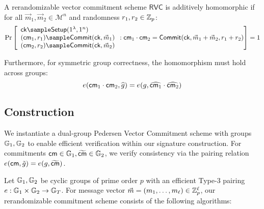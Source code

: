 \begin{definition}
A rerandomizable vector commitment scheme $\mathsf{RVC}$ is additively homomorphic if for all $\vec{m}_1, \vec{m}_2 \in \mathcal{M}^n$ and randomness $r_1, r_2 \in \mathbb{Z}_p$:
\[
    \Pr\left[
    \begin{array}{l}
        \mathsf{ck} \sample \mathsf{Setup}(1^\lambda, 1^n) \\
        (\cm_1, r_1) \sample \mathsf{Commit}(\mathsf{ck}, \vec{m}_1) \\
        (\cm_2, r_2) \sample \mathsf{Commit}(\mathsf{ck}, \vec{m}_2)
    \end{array}
    : \cm_1 \cdot \cm_2 = \mathsf{Commit}(\mathsf{ck}, \vec{m}_1 + \vec{m}_2, r_1 + r_2)
    \right] = 1
\]

\noindent Furthermore, for symmetric group correctness, the homomorphism must hold across groups:
\[
    e(\mathsf{cm}_1 \cdot \mathsf{cm}_2, \widehat{g}) = e(g, \widehat{\mathsf{cm}_1} \cdot \widehat{\mathsf{cm}_2})
\]
\end{definition}



\subsection{Construction}
We instantiate a dual-group Pedersen Vector Commitment scheme with groups $\mathbb{G}_1, \mathbb{G}_2$ to enable efficient verification within our signature construction. For commitments $\mathsf{cm} \in \mathbb{G}_1, \widetilde{\mathsf{cm}} \in \mathbb{G}_2$, we verify consistency via the pairing relation $e(\mathsf{cm}, \tilde{g}) = e(g, \widetilde{\mathsf{cm}})$.

Let $\mathbb{G}_1, \mathbb{G}_2$ be cyclic groups of prime order $p$ with an efficient Type-3 pairing $e: \mathbb{G}_1 \times \mathbb{G}_2 \to \mathbb{G}_T$. For message vector $\vec{m} = (m_1, \ldots, m_\ell) \in \mathbb{Z}_p^\ell$, our rerandomizable commitment scheme consists of the following algorithms:


